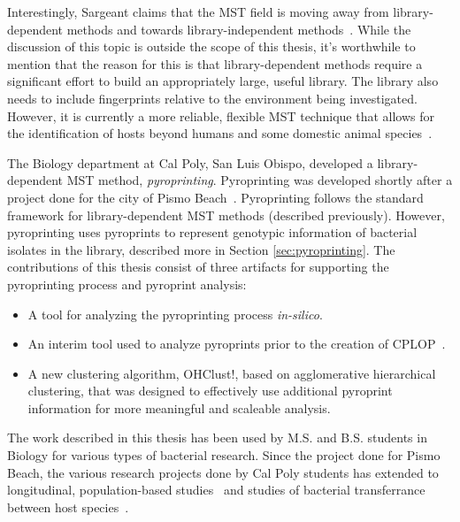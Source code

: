 \documentclass[12pt]{ucthesis}
\begin{document}
   Interestingly, Sargeant claims that the MST field is moving away from
   library-dependent methods and towards library-independent
   methods~\cite{Sargeant:ReviewMST}. While the discussion of this topic is
   outside the scope of this thesis, it's worthwhile to mention that the reason
   for this is that library-dependent methods require a significant effort to
   build an appropriately large, useful library. The library also needs to
   include fingerprints relative to the environment being investigated.
   However, it is currently a more reliable, flexible MST technique that allows
   for the identification of hosts beyond humans and some domestic animal
   species~\cite{Sargeant:ReviewMST}.

   The Biology department at Cal Poly, San Luis Obispo, developed a
   library-dependent MST method, \textit{pyroprinting}. Pyroprinting was
   developed shortly after a project done for the city of Pismo
   Beach~\cite{Kitts:Pismo, COSAM:Pismo}. Pyroprinting follows the standard
   framework for library-dependent MST methods (described previously). However,
   pyroprinting uses pyroprints to represent genotypic information of bacterial
   isolates in the library, described more in Section \ref{sec:pyroprinting}. 
   The contributions of this thesis consist of three artifacts for supporting
   the pyroprinting process and pyroprint analysis:
   \begin{itemize}
      \item A tool for analyzing the pyroprinting process \textit{in-silico}.
      \item An interim tool used to analyze pyroprints prior to the creation
            of CPLOP~\cite{Jan:Thesis}.
      \item A new clustering algorithm, \textsf{OHClust!}, based on
            agglomerative hierarchical clustering, that was designed to
            effectively use additional pyroprint information for more
            meaningful and scaleable analysis.
   \end{itemize}

   The work described in this thesis has been used by M.S. and B.S. students in
   Biology for various types of bacterial research. Since the project done for
   Pismo Beach, the various research projects done by Cal Poly students has
   extended to longitudinal, population-based studies~\cite{Emily:Demographics,
   Bufano:Humans_Pigs_Cows, Nguyen:Lambs_Ewes, Tang:Human} and studies of
   bacterial transferrance between host species~\cite{Josh:Cattle}.
\end{document}

